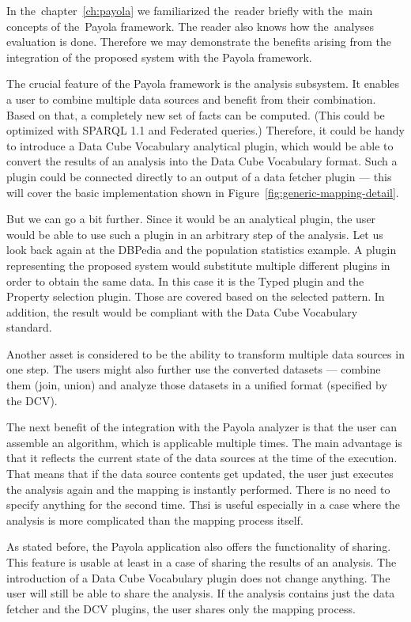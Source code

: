 In the~chapter~\ref{ch:payola} we familiarized the~reader briefly with the~main
concepts of the~Payola framework. The reader also knows how the~analyses
evaluation is done. Therefore we may demonstrate the benefits arising from the integration of the proposed system with the Payola framework.

The crucial feature of the Payola framework is the analysis subsystem. It enables a user
to combine multiple data sources and benefit from their 
combination. Based on that, a completely new set of facts can be computed.
(This could be optimized with SPARQL 1.1 and Federated queries.) 
Therefore, it could be handy to introduce a Data Cube Vocabulary analytical 
plugin, which would be able to convert the results of an analysis into the Data 
Cube Vocabulary format. Such a plugin could be connected directly to an output
of a data fetcher plugin --- this will cover the basic implementation shown in 
Figure~\ref{fig:generic-mapping-detail}.

But we can go a bit further. Since it would be an analytical plugin, the user 
would be able to use such a plugin in an arbitrary step of the analysis. Let us look back again
at the DBPedia and the population statistics example. A plugin representing the proposed system would substitute multiple different plugins 
in order to obtain the same data. In this case it is the Typed 
plugin and the Property selection plugin. Those are covered based on the selected pattern.
In addition, the result would be 
compliant with the Data Cube Vocabulary standard.

Another asset is considered to be the ability to transform multiple data 
sources in one step. The users might also further use the converted datasets --- combine them
(join, union) and analyze those datasets in a unified format (specified by the DCV).

The next benefit of the integration with the Payola analyzer is that the user 
can assemble an algorithm, which is applicable multiple times. The main 
advantage is that it reflects the current state of the data sources at
the time of the execution. That means that if the data source contents get 
updated, the user just executes the analysis again and the mapping is instantly 
performed. There is no need to specify anything for the second time.
Thsi is useful especially in a case where the analysis is more complicated than the 
mapping process itself.

As stated before, the Payola application also offers the functionality of 
sharing. This feature is usable at least in a case of sharing the results 
of an analysis. The introduction of a Data Cube Vocabulary plugin does not change anything.
The user will still be able to share the analysis. If the analysis contains just the data fetcher 
and the DCV plugins, the user shares only the mapping process.

